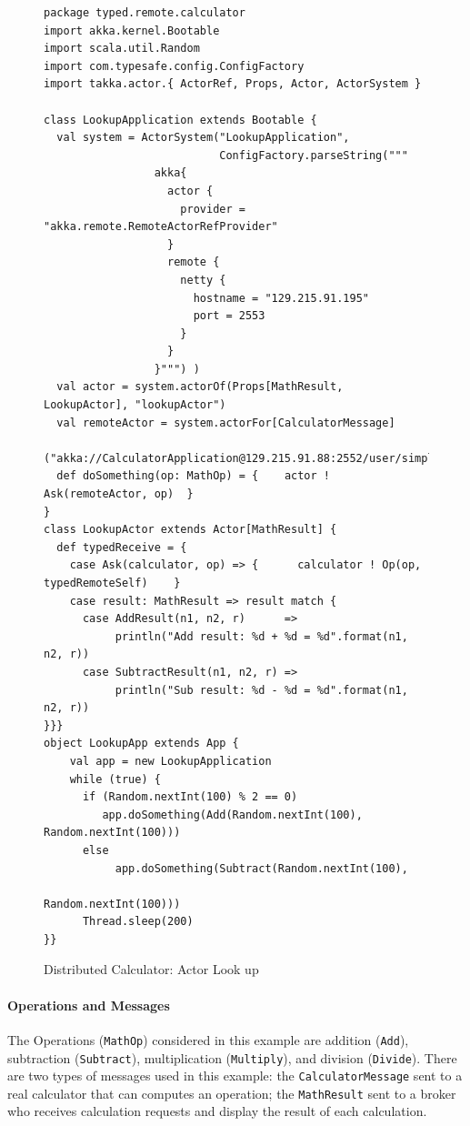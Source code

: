 \begin{figure}[p]
\begin{lstlisting}
package typed.remote.calculator
import akka.kernel.Bootable
import scala.util.Random
import com.typesafe.config.ConfigFactory
import takka.actor.{ ActorRef, Props, Actor, ActorSystem }

class LookupApplication extends Bootable {
  val system = ActorSystem("LookupApplication", 
                           ConfigFactory.parseString(""" 
                 akka{
                   actor {
                     provider = "akka.remote.RemoteActorRefProvider"
                   }
                   remote {
                     netty {
                       hostname = "129.215.91.195"
                       port = 2553               
                     }
                   }
                 }""") )
  val actor = system.actorOf(Props[MathResult, LookupActor], "lookupActor")
  val remoteActor = system.actorFor[CalculatorMessage]
       ("akka://CalculatorApplication@129.215.91.88:2552/user/simpleCalculator")
  def doSomething(op: MathOp) = {    actor ! Ask(remoteActor, op)  }
}
class LookupActor extends Actor[MathResult] {
  def typedReceive = {
    case Ask(calculator, op) => {      calculator ! Op(op, typedRemoteSelf)    }
    case result: MathResult => result match {
      case AddResult(n1, n2, r)      => 
           println("Add result: %d + %d = %d".format(n1, n2, r))
      case SubtractResult(n1, n2, r) => 
           println("Sub result: %d - %d = %d".format(n1, n2, r))
}}}
object LookupApp extends App {
    val app = new LookupApplication
    while (true) {
      if (Random.nextInt(100) % 2 == 0) 
         app.doSomething(Add(Random.nextInt(100), Random.nextInt(100)))
      else 
           app.doSomething(Subtract(Random.nextInt(100), 
                                        Random.nextInt(100)))
      Thread.sleep(200)
}}

\end{lstlisting}
\caption{Distributed Calculator: Actor Look up}
\label{discal_lookup}
\end{figure}

\paragraph{Operations and Messages} The Operations ({\tt MathOp}) considered in 
this example are addition ({\tt Add}), subtraction ({\tt Subtract}), 
multiplication ({\tt Multiply}), and division ({\tt Divide}).  There are two 
types of messages used in this example: the {\tt CalculatorMessage} sent to a 
real calculator that can computes an operation; the {\tt MathResult} sent to a 
broker who receives calculation requests and display the result of each 
calculation.


